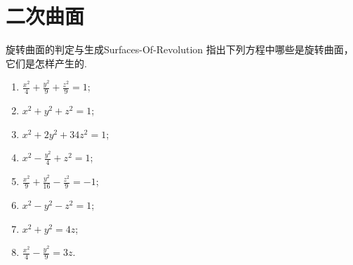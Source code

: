 \section{二次曲面}

\begin{problem}{旋转曲面的判定与生成}{Surfaces-Of-Revolution}
    指出下列方程中哪些是旋转曲面，它们是怎样产生的.
    \begin{enumerate}
        \item $\frac{x^{2}}{4}+\frac{y^{2}}{9}+\frac{z^{2}}{9}=1$;
        \item $x^{2}+y^{2}+z^{2}=1$;
        \item $x^{2}+2 y^{2}+34 z^{2}=1$;
        \item $x^{2}-\frac{y^{2}}{4}+z^{2}=1$;
        \item $\frac{x^{2}}{9}+\frac{y^{2}}{16}-\frac{z^{2}}{9}=-1$;
        \item $x^{2}-y^{2}-z^{2}=1$;
        \item $x^{2}+y^{2}=4 z$;
        \item $\frac{x^{2}}{4}-\frac{y^{2}}{9}=3 z$.
    \end{enumerate}
\end{problem}

